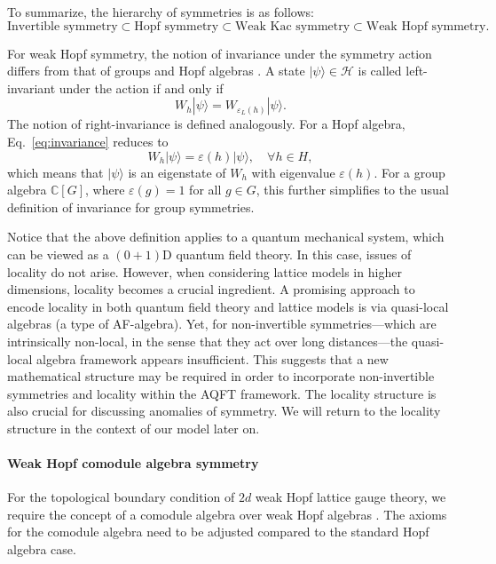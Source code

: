 \documentclass[a4paper,11pt]{article}
\theoremstyle{theorem}
\theoremstyle{remark}
\begin{document}
To summarize, the hierarchy of symmetries is as follows:
\begin{equation}
    \text{Invertible symmetry} \subset \text{Hopf symmetry} \subset \text{Weak Kac symmetry} \subset \text{Weak Hopf symmetry}.
\end{equation}


For weak Hopf symmetry, the notion of invariance under the symmetry action differs from that of groups and Hopf algebras \cite{Jia2023weak}. A state \(|\psi\rangle \in \mathcal{H}\) is called left-invariant under the action if and only if 
\begin{equation} \label{eq:invariance}
   W_h |\psi\rangle = W_{\varepsilon_L(h)} |\psi\rangle.
\end{equation}
The notion of right-invariance is defined analogously.
For a Hopf algebra, Eq.~\eqref{eq:invariance} reduces to 
\begin{equation}
   W_h |\psi\rangle = \varepsilon(h) |\psi\rangle, \quad \forall h \in H,
\end{equation}
which means that \(|\psi\rangle\) is an eigenstate of \(W_h\) with eigenvalue \(\varepsilon(h)\).
For a group algebra \(\mathbb{C}[G]\), where \(\varepsilon(g) = 1\) for all \(g \in G\), this further simplifies to the usual definition of invariance for group symmetries.



Notice that the above definition applies to a quantum mechanical system, which can be viewed as a $(0+1)$D quantum field theory. In this case, issues of locality do not arise. However, when considering lattice models in higher dimensions, locality becomes a crucial ingredient. A promising approach to encode locality in both quantum field theory and lattice models is via quasi-local algebras (a type of AF-algebra). Yet, for non-invertible symmetries—which are intrinsically non-local, in the sense that they act over long distances—the quasi-local algebra framework appears insufficient. This suggests that a new mathematical structure may be required in order to incorporate non-invertible symmetries and locality within the AQFT framework. The locality structure is also crucial for discussing anomalies of symmetry.
We will return to the locality structure in the context of our model later on.



\paragraph{Weak Hopf comodule algebra symmetry} 
For the topological boundary condition of $2d$ weak Hopf lattice gauge theory, we require the concept of a comodule algebra over weak Hopf algebras \cite{Jia2023weak}. The axioms for the comodule algebra need to be adjusted compared to the standard Hopf algebra case.
\end{document}
